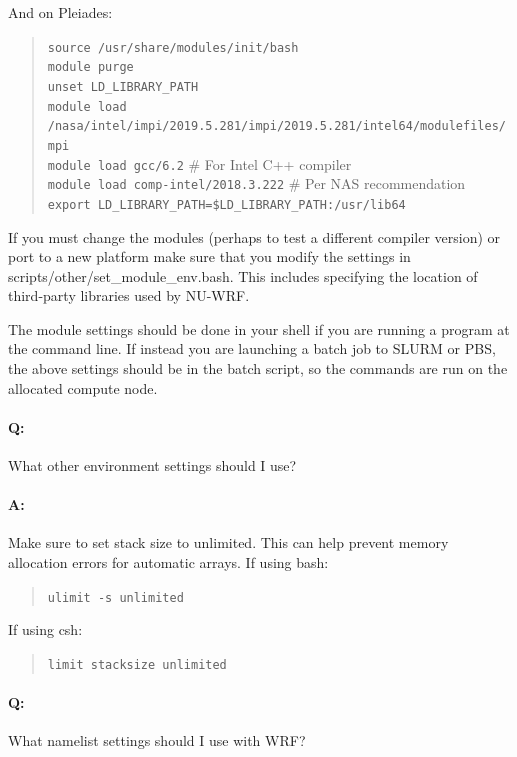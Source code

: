 And on Pleiades:

\begin{quote}
\texttt{source /usr/share/modules/init/bash} \\
\texttt{module purge} \\
\texttt{unset LD\_LIBRARY\_PATH} \\
\texttt{module load /nasa/intel/impi/2019.5.281/impi/2019.5.281/intel64/modulefiles/mpi} \\
\texttt{module load gcc/6.2} \# For Intel C++ compiler \\
\texttt{module load comp-intel/2018.3.222} \# Per NAS recommendation \\
\texttt{export LD\_LIBRARY\_PATH=\$LD\_LIBRARY\_PATH:/usr/lib64} \\
\end{quote}

If you must change the modules (perhaps to test a different compiler version) or port to a new platform make sure that you modify the settings in scripts/other/set\_module\_env.bash. This includes specifying the location of third-party libraries used by NU-WRF.

The module settings should be done in your shell if you are running a program 
at the command line. If instead you are launching a batch job to SLURM or PBS,
the above settings should be in the batch script, so the commands are run on 
the allocated compute node.

\paragraph{Q:} What other environment settings should I use?

\paragraph{A:} Make sure to set stack size to unlimited. This can help 
prevent memory allocation errors for automatic arrays. If using bash:

\begin{quote}
\texttt{ulimit -s unlimited}
\end{quote}

If using csh:

\begin{quote}
\texttt{limit stacksize unlimited}
\end{quote}

\paragraph{Q:} What namelist settings should I use with WRF?


